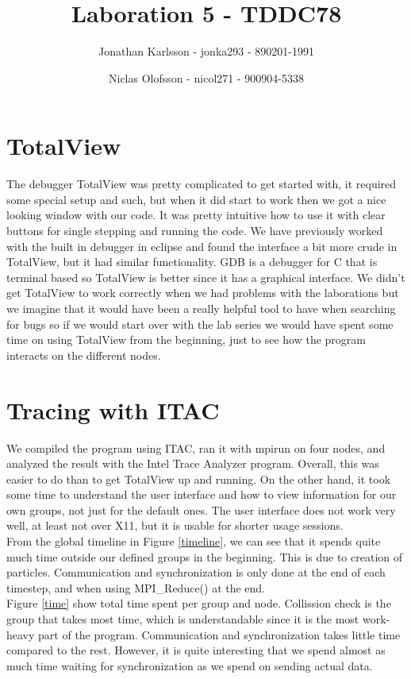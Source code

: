\documentclass[a4paper]{article}
\author{Jonathan Karlsson - jonka293 - 890201-1991 \and Niclas Olofsson - nicol271 - 900904-5338}
\title{Laboration 5 - TDDC78}
\begin{document}
\maketitle

\section{TotalView}

The debugger TotalView was pretty complicated to get started with, it
required some special setup and such, but when it did start to work then
we got a nice looking window with our code. It was pretty intuitive how
to use it with clear buttons for single stepping and running the code.
We have previously worked with the built in debugger in eclipse and
found the interface a bit more crude in TotalView, but it had similar
functionality. GDB is a debugger for C that is terminal based so
TotalView is better since it has a graphical interface. We didn\rq{}t
get TotalView to work correctly when we had problems with the
laborations but we imagine that it would have been a really helpful tool
to have when searching for bugs so if we would start over with the lab
series we would have spent some time on using TotalView from the
beginning, just to see how the program interacts on the different nodes.


\section{Tracing with ITAC}

We compiled the program using ITAC, ran it with mpirun on four nodes,
and analyzed the result with the Intel Trace Analyzer program. Overall,
this was easier to do than to get TotalView up and running. On the other
hand, it took some time to understand the user interface and how to view
information for our own groups, not just for the default ones. The user
interface does not work very well, at least not over X11, but it is
usable for shorter usage sessions.\\

From the global timeline in Figure \ref{timeline}, we can see that it
spends quite much time outside our defined groups in the beginning. This
is due to creation of particles. Communication and synchronization is
only done at the end of each timestep, and when using MPI\_Reduce() at
the end.\\

Figure \ref{time} show total time spent per group and node. Collission
check is the group that takes most time, which is understandable since
it is the most work-heavy part of the program. Communication and
synchronization takes little time compared to the rest. However, it is
quite interesting that we spend almost as much time waiting for
synchronization as we spend on sending actual data.\\
\end{document}
